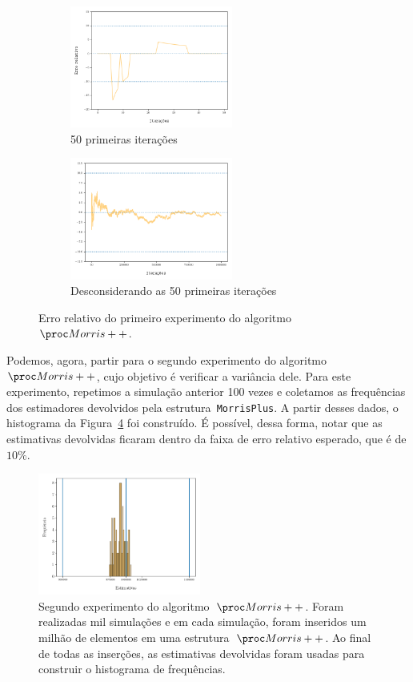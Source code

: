 \begin{figure}
  \centering
  \begin{subfigure}{.5\textwidth}
    \centering
    \includegraphics[height=4cm, width=\linewidth]{figuras/morris_plus_erro_first.png}
    \caption{50 primeiras iterações}
    \label{fig:morris:plus:erro:first}
  \end{subfigure}%
  \begin{subfigure}{.5\textwidth}
    \centering
    \captionsetup{justification=centering}
    \includegraphics[height=4cm, width=\textwidth]{figuras/morris_plus_erro_sem_first.png}
	  \caption{Desconsiderando as 50 primeiras iterações}
    \label{fig:morris:plus:erro:sem:first}
  \end{subfigure}
  \caption{Erro relativo do primeiro experimento do algoritmo~$\Morrispp$.}
\end{figure}

Podemos, agora, partir para o segundo experimento do algoritmo~$\Morrispp$, cujo objetivo é verificar a variância dele.
Para este experimento, repetimos a simulação anterior 100 vezes e coletamos as frequências dos estimadores devolvidos
pela estrutura~\texttt{MorrisPlus}. A partir desses dados, o histograma da Figura~\ref{fig:morris:plus:variance} foi 
construído. É possível, dessa forma, notar que as estimativas devolvidas ficaram dentro da faixa de erro relativo 
esperado, que é de $10\%$.

\begin{figure}[h]
  \centering
  \includegraphics[height=4cm, width=.5\textwidth]{figuras/morris_plus_variance.png}
	\caption{Segundo experimento do algoritmo~$\Morrispp$. Foram realizadas mil simulações e em cada simulação, foram 
  inseridos um milhão de elementos em uma estrutura~$\Morrispp$. Ao final de todas as inserções, as estimativas 
  devolvidas foram usadas para construir o histograma de frequências.}
  \label{fig:morris:plus:variance}
\end{figure}

